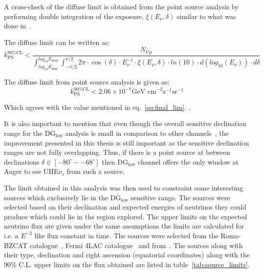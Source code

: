 A cross-check of the diffuse limit is obtained from the point source analysis by performing double integration of the exposure, $\xi(E_{\nu}, \delta)$ similar to what was done in~\cite{gap_note_2013}.

The diffuse limit can be written as:
\begin{equation}
  k_{\text{PS}}^{90\% \text{CL}} < \frac{N_{\text{Up}}}{\int_{log_{10}E_{\text{min}}}^{log_{10}E_{\text{max}}} \int_{-\pi/2}^{\pi/2}2\pi \cdot \cos(\delta) \cdot E_{\nu}^{-1} \cdot \xi(E_{\nu}, \delta) \cdot ln(10) \cdot d(log_{10}(E_{\nu})) \cdot d\delta}
\end{equation}

The diffuse limit from point source analysis is given as: 
\begin{equation}
  k_{\text{PS}}^{90\%\text{CL}} < 2.06 \times 10^{-7} \text{GeV cm}^{-2} \text{s}^{-1} \text{sr}^{-1}
\end{equation}

Which agrees with the value mentioned in eq.~\ref{eq:final_lim}. . 

It is also important to mention that even though the overall sensitive declination range for the DG$_{\text{low}}$ analysis is small in comparison to other channels~\cite{Aab_2019_point}, the improvement presented in this thesis is still important as the sensitive declination ranges are not fully overlapping. Thus, if there is a point source at between declinations $ \delta \in [-80^{\circ}- -68^{\circ}]$ then DG$_{\text{low}}$ channel offers the only window at Auger to see UHE$\nu_s$ from such a source.  



The limit obtained in this analysis was then used to constraint some interesting sources which exclusively lie in the DG$_{\text{low}}$ sensitive range. The sources were selected based on their declination and expected energies of neutrinos they could produce which could lie in the region explored. The upper limits on the expected neutrino flux are given under the same assumptions the limits are calculated for i.e. a $E^{-2}$ like flux constant in time. The sources were selected from the Roma-BZCAT catalogue~\cite{Massaro:2008ye}, Fermi 4LAC catalogue~\cite{Ballet:2020hze} and from~\cite{Wakely:2007qpa}. The sources along with their type, declination and right ascension (equatorial coordinates) along with the 90\% C.L. upper limits on the flux obtained are listed in table~\ref{tab:source_limits}. 

